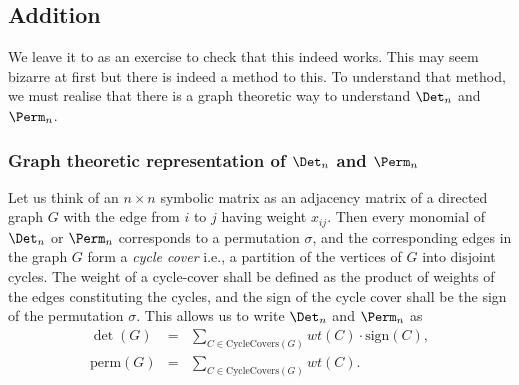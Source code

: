 \subsection*{Addition}

\begin{center}
\end{center}

We leave it to as an exercise to check that this indeed works. This may seem bizarre at first but there is indeed a
method to this. To understand that method, we must realise that there is a graph theoretic way to understand $\Det_n$ and $\Perm_n$.

\subsubsection*{Graph theoretic representation of $\Det_n$ and $\Perm_n$}

Let us think of an $n\times n$ symbolic matrix as an adjacency matrix of a directed graph $G$ with the edge from $i$ to $j$ having weight $x_{ij}$.
Then every monomial of $\Det_n$ or $\Perm_n$ corresponds to a permutation $\sigma$, and the corresponding edges in the graph $G$ form a \emph{cycle cover} i.e., a partition of the vertices of $G$ into disjoint cycles.
The weight of a cycle-cover shall be defined as the product of weights of the edges constituting the cycles, and the sign of the cycle cover shall be the sign of the permutation $\sigma$.
This allows us to write $\Det_n$ and $\Perm_n$ as
\begin{eqnarray*}
\det(G) & = & \sum_{C\in \mathrm{CycleCovers}(G)} wt(C) \cdot \mathrm{sign}(C),\\
\mathrm{perm}(G) & = & \sum_{C\in \mathrm{CycleCovers}(G)} wt(C).\\
\end{eqnarray*}


